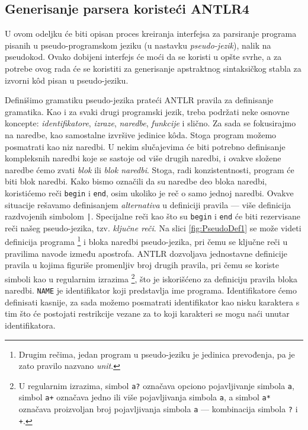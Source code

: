 \subsection{Generisanje parsera koristeći ANTLR4}
\label{subsec:ANTLRParserGeneration}

U ovom odeljku će biti opisan proces kreiranja interfejsa za parsiranje programa pisanih u pseudo-programskom jeziku (u nastavku \emph{pseudo-jezik}), nalik na pseudokod. Ovako dobijeni interfejs će moći da se koristi u opšte svrhe, a za potrebe ovog rada će se koristiti za generisanje apstraktnog sintaksičkog stabla za izvorni k\^od pisan u pseudo-jeziku.

Definišimo gramatiku pseudo-jezika prateći ANTLR pravila za definisanje gramatika. Kao i za svaki drugi programski jezik, treba podržati neke osnovne koncepte: \emph{identifikatore}, \emph{izraze}, \emph{naredbe}, \emph{funkcije} i slično. Za sada se fokusirajmo na naredbe, kao samostalne izvršive jedinice k\^oda. Stoga program možemo posmatrati kao niz naredbi. U nekim slučajevima će biti potrebno definisanje kompleksnih naredbi koje se sastoje od više drugih naredbi, i ovakve složene naredbe ćemo zvati \emph{blok} ili \emph{blok naredbi}. Stoga, radi konzistentnosti, program će biti blok naredbi. Kako bismo označili da su naredbe deo bloka naredbi, koristićemo reči \texttt{begin} i \texttt{end}, osim ukoliko je reč o samo jednoj naredbi. Ovakve situacije rešavamo definisanjem \emph{alternativa} u definiciji pravila --- više definicija razdvojenih simbolom \texttt{|}. Specijalne reči kao što su \texttt{begin} i \texttt{end} će biti rezervisane reči našeg pseudo-jezika, tzv. \emph{ključne reči}. Na slici \ref{fig:PseudoDef1} se može videti definicija programa \footnote{Drugim rečima, jedan program u pseudo-jeziku je jedinica prevođenja, pa je zato pravilo nazvano \emph{unit}.} i bloka naredbi pseudo-jezika, pri čemu se ključne reči u pravilima navode između apostrofa. ANTLR dozvoljava jednostavne definicije pravila u kojima figuriše promenljiv broj drugih pravila, pri čemu se koriste simboli kao u regularnim izrazima \footnote{U regularnim izrazima, simbol \texttt{a?} označava opciono pojavljivanje simbola \texttt{a}, simbol \texttt{a+} označava jedno ili više pojavljivanja simbola \texttt{a}, a simbol \texttt{a*} označava proizvoljan broj pojavljivanja simbola \texttt{a} --- kombinacija simbola \texttt{?} i \texttt{+}.}, što je iskorišćeno za definiciju pravila bloka naredbi. \texttt{NAME} je identifikator koji predstavlja ime programa. Identifikatore ćemo definisati kasnije, za sada možemo posmatrati identifikator kao nisku karaktera s tim što će postojati restrikcije vezane za to koji karakteri se mogu naći unutar identifikatora.

